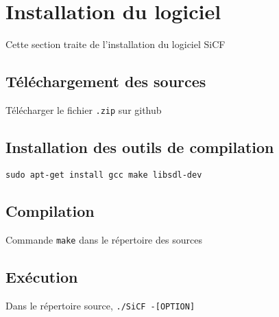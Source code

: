 
\section{Installation du logiciel}

Cette section traite de l'installation du logiciel SiCF

\subsection{Téléchargement des sources}

Télécharger le fichier \texttt{.zip} sur github

\subsection{Installation des outils de compilation}

\texttt{sudo apt-get install gcc make libsdl-dev}

\subsection{Compilation}

Commande \texttt{make} dans le répertoire des sources

\subsection{Exécution}

Dans le répertoire source, \texttt{./SiCF -[OPTION]}
